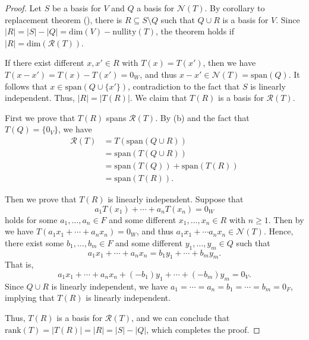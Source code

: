 \begin{proof}
  Let $S$ be a basis for $V$ and $Q$ a basis for $\mathcal{N}(T)$.
  By corollary to replacement theorem (), there is
  $R \subseteq S \setminus Q$ such that $Q \cup R$ is a basis for $V$.
  Since $|R| = |S| - |Q| = \mathrm{dim}(V) - \mathrm{nullity}(T)$,
  the theorem holds if $|R| = \mathrm{dim}(\mathcal{R}(T))$.
  
  If there exist different $x, x' \in R$ with $T(x) = T(x')$, then we have
  $T(x - x') = T(x) - T(x') = 0_W$, and thus
  $x - x' \in \mathcal{N}(T) = \mathrm{span}(Q)$.
  It follows that $x \in \mathrm{span}(Q \cup \{x'\})$,
  contradiction to the fact that $S$ is linearly independent.
  Thus, $|R| = |T(R)|$. We claim that $T(R)$ is a basis for $\mathcal{R}(T)$.

  First we prove that $T(R)$ spans $\mathcal{R}(T)$.
  By  (b) and the fact that $T(Q) = \{0_V\}$, we have
  \begin{align*}
    \mathcal{R}(T) &= T(\mathrm{span}(Q \cup R)) \\
                   &= \mathrm{span}(T(Q \cup R)) \\
                   &= \mathrm{span}(T(Q)) + \mathrm{span}(T(R)) \\
                   &= \mathrm{span}(T(R)).
  \end{align*}

  Then we prove that $T(R)$ is linearly independent.
  Suppose that
  \begin{equation*}
    a_1T(x_1) + \cdots + a_nT(x_n) = 0_W
  \end{equation*}
  holds for some $a_1, \dots, a_n \in F$ and some different
  $x_1, \dots, x_n \in R$ with $n \geq 1$.
  Then by  we have $T(a_1x_1 + \cdots + a_nx_n) = 0_W$,
  and thus $a_1x_1 + \cdots a_nx_n \in \mathcal{N}(T)$.
  Hence, there exist some $b_1, \dots, b_m \in F$ and some different
  $y_1, \dots, y_m \in Q$ such that
  \begin{equation*}
    a_1x_1 + \cdots + a_nx_n = b_1y_1 + \cdots + b_my_m.
  \end{equation*}
  That is,
  \begin{equation*}
    a_1x_1 + \cdots + a_nx_n + (-b_1)y_1 + \cdots + (-b_m)y_m = 0_V.
  \end{equation*}
  Since $Q \cup R$ is linearly independent, we have
  $a_1 = \cdots = a_n = b_1 = \cdots = b_m = 0_F$, implying that $T(R)$ is
  linearly independent.

  Thus, $T(R)$ is a basis for $\mathcal{R}(T)$, and we can conclude that
  $\mathrm{rank}(T) = |T(R)| = |R| = |S| - |Q|$, which completes the proof.
\end{proof}
